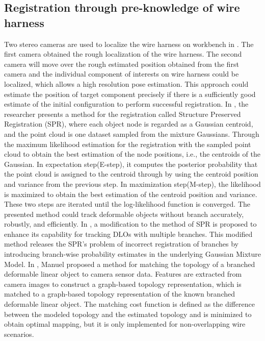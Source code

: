 \subsection{Registration through pre-knowledge of wire harness}
    Two stereo cameras are used to localize the wire harness 
    on workbench in \cite{10.1007/978-3-031-27933-1_31}. The first camera obtained the rough localization of the wire harness. The second camera will move over the rough estimated position 
    obtained from the first camera and the individual component of interests on wire harness could be localized, which allows a high resolution pose estimation. This approach could estimate 
    the position of target component precisely if there is a sufficiently good estimate of the initial configuration to perform successful registration.
    In \cite{doi:10.1177/0278364919841431}, the researcher presents a method for the registration called Structure Preserved Registration (SPR), where each object node is regarded as a Gaussian 
    centroid, and the point cloud is one dataset sampled from the mixture Gaussians. Through the maximum likelihood estimation for the registration with the sampled point cloud to obtain the 
    best estimation of the node positions, i.e., the centroids of the Gaussian. In expectation step(E-step), it computes the posterior probability that the point cloud is assigned to the
    centroid through by using the centroid position and variance from the previous step. In maximization step(M-step), the likelihood is maximized to obtain the best estimation of the centroid position 
    and variance. These two steps are iterated until the log-likelihood function is converged. The presented method could track deformable objects without branch accurately, robustly, and efficiently. 
    In \cite{9665147}, a modification to the method of SPR is proposed to enhance its capability for tracking DLOs with multiple branches. This modified method releases the SPR's problem of incorrect 
    registration of branches by introducing branch-wise probability estimates in the underlying Gaussian Mixture Model. In \cite{10161483}, Manuel proposed a method for matching the topology of a branched 
    deformable linear object to camera sensor data. Features are extracted from camera images to construct a graph-based topology representation, which is matched to a graph-based topology 
    representation of the known branched deformable linear object. The matching cost function is defined as the difference between the modeled topology 
    and the estimated topology and is minimized to obtain optimal mapping, but it is only implemented for non-overlapping wire scenarios.
